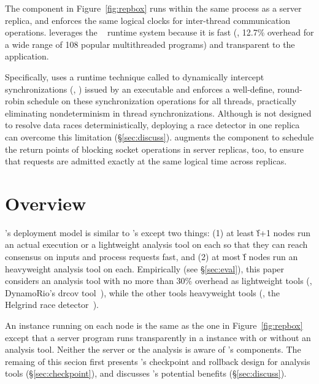 The \dmt component in Figure~\ref{fig:repbox} runs within the same process as a server replica, and
enforces the same logical clocks for inter-thread communication
operations. \repbox leverages the \parrot~\cite{parrot:sosp13} \dmt runtime
system because it is fast (\ie, 12.7\% overhead for a wide range of 108 popular 
multithreaded programs) and transparent to the application.


Specifically, \parrot uses a runtime technique called \ldpreload to dynamically 
intercept \pthread synchronizations (\eg, \mutexlock) issued by an executable 
and enforces a well-define, round-robin schedule on these synchronization 
operations for all threads, practically eliminating nondeterminism in thread
synchronizations. Although \parrot is not designed to resolve data races
deterministically, deploying a race detector in one replica can overcome this 
limitation (\S\ref{sec:discuss}).  \repbox augments the \dmt component to schedule 
the return points of blocking socket operations in server replicas, too, to 
ensure that requests are admitted exactly at the same logical time across 
replicas.



\section{\xxx Overview} \label{sec:overview}

\xxx's deployment model is similar to \repbox's except two things: (1) at least \v{f}+1 nodes 
run an actual execution or a lightweight analysis tool on 
each so that they can reach consensus on inputs and process requests fast, and 
(2) at most \v{f} nodes run an heavyweight analysis tool on each. Empirically 
(see \S\ref{sec:eval}), this paper considers an analysis tool with no more than 30\% overhead as 
lightweight tools (\eg, DynamoRio's drcov tool~\cite{dynamorio}), while the other tools heavyweight 
tools (\eg, the Helgrind race detector~\cite{valgrind:pldi}).

An \xxx instance running on each node is the same as the one in 
Figure~\ref{fig:repbox} except that a server program runs transparently in a \xxx instance 
with or without an analysis tool. Neither the server or the analysis is aware of \xxx's 
components. The remaing of this secion first presents \xxx's checkpoint and 
rollback design for analysis tools (\S\ref{sec:checkpoint}), and discusses \xxx's potential 
benefits (\S\ref{sec:discuss}).

